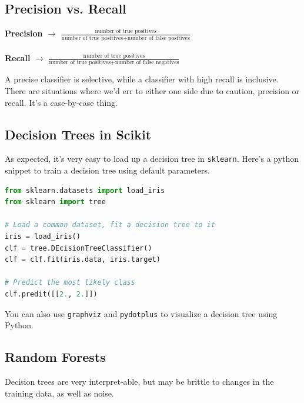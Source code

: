 \documentclass[english, 10pt]{article}
\begin{document}
\subsection{Precision vs. Recall}

\hfill \begin{tcolorbox}[title=Definitions:,colframe=red!75!black,colback=red!5!white,arc=0pt,fonttitle=\bfseries]
\textbf{Precision} $\rightarrow$ $\frac{\text{number of true positives}}{\text{number of true positives}+\text{number of false positives}}$\\\\
\textbf{Recall} $\rightarrow$ $\frac{\text{number of true positives}}{\text{number of true positives}+\text{number of false negatives}}$
\end{tcolorbox}

\hfill \break A precise classifier is selective, while a classifier with high recall is inclusive. There are situations where we'd err to either one side due to caution, precision or recall. It's a case-by-case thing.

\subsection{Decision Trees in Scikit}

As expected, it's very easy to load up a decision tree in \texttt{sklearn}. Here's a python snippet to train a decision tree using default parameters.\\

{\centering
\begin{lstlisting}[language=python]
from sklearn.datasets import load_iris
from sklearn import tree

# Load a common dataset, fit a decision tree to it
iris = load_iris()
clf = tree.DEcisionTreeClassifier()
clf = clf.fit(iris.data, iris.target)

# Predict the most likely class
clf.predit([[2., 2.]])
\end{lstlisting}
}

You can also use \texttt{graphviz} and \texttt{pydotplus} to visualize a decision tree using Python.

\subsection{Random Forests}

Decision trees are very interpret-able, but may be brittle to changes in the training data, as well as noise.\\
\end{document}
